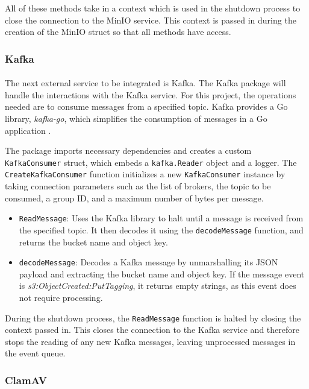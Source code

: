 \documentclass[12pt, conference, final, a4paper, onecolumn, compsoc]{IEEEtran}
\begin{document}
All of these methods take in a context which is used in the shutdown process to
close the connection to the MinIO service. This context is passed in during the
creation of the MinIO struct so that all methods have access.

\subsubsection*{Kafka}
\paragraph{}

The next external service to be integrated is Kafka. The Kafka package will
handle the interactions with the Kafka service. For this project, the operations
needed are to consume messages from a specified topic. Kafka provides a Go
library, \textit{kafka-go}, which simplifies the consumption of messages in a Go
application \citep{kafka-go-repo}.

The package imports necessary dependencies and creates a custom
\texttt{KafkaConsumer} struct, which embeds a \texttt{kafka.Reader} object and a
logger. The \texttt{CreateKafkaConsumer} function initializes a new
\texttt{KafkaConsumer} instance by taking connection parameters such as the list
of brokers, the topic to be consumed, a group ID, and a maximum number of bytes
per message.

\begin{itemize}
  \item \texttt{ReadMessage}: Uses the Kafka library to halt until a message is
        received from the specified topic. It then decodes it using the
        \texttt{decodeMessage} function, and returns the bucket name and object
        key.
  \item \texttt{decodeMessage}: Decodes a Kafka message by unmarshalling its
        JSON payload and extracting the bucket name and object key. If the
        message event is \textit{s3:ObjectCreated:PutTagging}, it returns empty
        strings, as this event does not require processing.
\end{itemize}

During the shutdown process, the \texttt{ReadMessage} function is halted by
closing the context passed in. This closes the connection to the Kafka service
and therefore stops the reading of any new Kafka messages, leaving unprocessed
messages in the event queue.

\subsubsection*{ClamAV}
\end{document}
